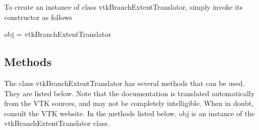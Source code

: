 To create an instance of class vtk\-Branch\-Extent\-Translator, simply invoke its constructor as follows \begin{DoxyVerb}  obj = vtkBranchExtentTranslator
\end{DoxyVerb}
 \hypertarget{vtkwidgets_vtkxyplotwidget_Methods}{}\subsection{Methods}\label{vtkwidgets_vtkxyplotwidget_Methods}
The class vtk\-Branch\-Extent\-Translator has several methods that can be used. They are listed below. Note that the documentation is translated automatically from the V\-T\-K sources, and may not be completely intelligible. When in doubt, consult the V\-T\-K website. In the methods listed below, {\ttfamily obj} is an instance of the vtk\-Branch\-Extent\-Translator class. 
